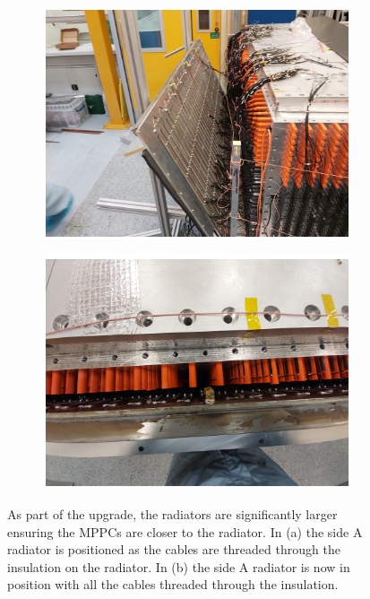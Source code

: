 \begin{figure}[!h]
\centering
\begin{subfigure}{.5\textwidth}
  \centering
  \includegraphics[width=\linewidth]{Chapter3/Figs/Raster/detCon026b_HaningOffRadiator.png}
  \captionsetup{width=.9\linewidth}
  \caption{}
  \label{subFig:detCon026b_HaningOffRadiator}
\end{subfigure}%
\begin{subfigure}{.5\textwidth}
  \centering
  \includegraphics[width=\linewidth]{Chapter3/Figs/Raster/detCon028b_RadiatorTopDown.png}
  \captionsetup{width=.9\linewidth}
  \caption{}
  \label{subFig:detCon028b_RadiatorTopDown}
\end{subfigure}
\caption[The new more massive radiators being put into position.]{As part of the upgrade, the radiators are significantly larger ensuring the MPPCs are closer to the radiator. In (a) the side A radiator is positioned as the cables are threaded through the insulation on the radiator. In (b) the side A radiator is now in position with all the cables threaded through the insulation.}
\label{fig:detCon_HaningOffRadiator_RadiatorTopDown}
\end{figure}

